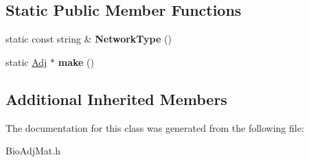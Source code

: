 \subsection*{Static Public Member Functions}
\begin{DoxyCompactItemize}
\item 
\mbox{\label{class_bio_adj_mat_a12c0a3faa184d18fa08770040db50034}} 
static const string \& {\bfseries Network\+Type} ()
\item 
\mbox{\label{class_bio_adj_mat_af6ec0b8518dd412025dafb082f921186}} 
static \hyperlink{class_adj}{Adj} $\ast$ {\bfseries make} ()
\end{DoxyCompactItemize}
\subsection*{Additional Inherited Members}


The documentation for this class was generated from the following file\+:\begin{DoxyCompactItemize}
\item 
Bio\+Adj\+Mat.\+h\end{DoxyCompactItemize}
